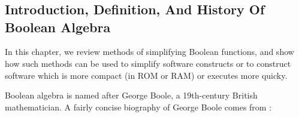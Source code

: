 \chapter[\cbalzeroshorttitle{}]{\cbalzerolongtitle{}}

\label{cbal0}

\section{Introduction, Definition, And History Of Boolean Algebra}
\label{cbal0:sint0}

In this chapter, we review methods of 
simplifying Boolean functions, and
show how such methods can be used to simplify software constructs
or to construct software which is more compact (in ROM or RAM) 
or executes more quicky.

Boolean algebra is named after George Boole, 
a 19th-century British mathematician.
A fairly concise biography of George Boole comes from 
\cite{bibref:w:georgeboolebio01}:

